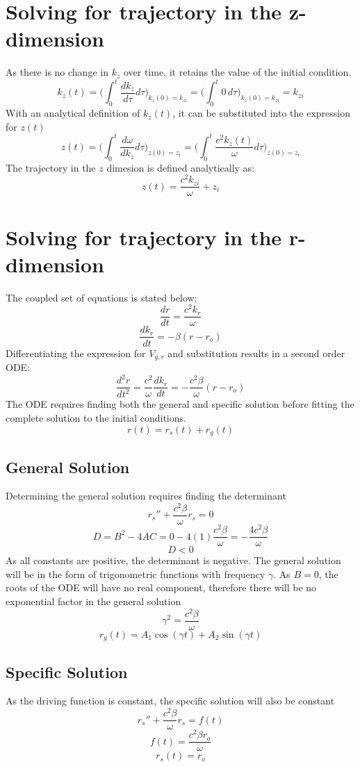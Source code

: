 \documentclass[11pt]{article}
\begin{document}
\section*{Solving for trajectory in the z-dimension}
As there is no change in $k_z$ over time, it retains the value of the initial condition.
$$k_z(t) = \bigg(\int_0^t{\frac{dk_z}{d\tau} d\tau}\bigg)_{k_z(0)=k_{zi}} = \bigg(\int_0^t{0\, d\tau}\bigg)_{k_z(0)=k_{zi}} = k_{zi} $$
With an analytical definition of $k_z(t)$, it can be substituted into the expression for $z(t)$
$$ z(t) = \bigg(\int_0^t{\frac{d\omega}{dk_z} d\tau}\bigg)_{z(0)=z_i} = \bigg(\int_0^t{\frac{c^2k_z(t)}{\omega} d\tau}\bigg)_{z(0)=z_i}$$
The trajectory in the $z$ dimesion is defined analytically as:
$$ z(t)= \frac{c^2k_{zi}}{\omega}+z_i$$

\section*{Solving for trajectory in the r-dimension}
The coupled set of equations is stated below:
$$\frac{dr}{dt} = \frac{c^2k_r}{\omega}$$
$$\frac{dk_r}{dt} = -\beta (r-r_o)$$
Differentiating the expression for $V_{g,r}$ and substitution results in a second order ODE:
$$\frac{d^2r}{dt^2} = \frac{c^2}{\omega}\frac{dk_r}{dt} = -\frac{c^2 \beta}{\omega}(r-r_o)$$
The ODE requires finding both the general and specific solution before fitting the complete solution to the initial conditions. 
$$r(t) = r_s(t) + r_g(t) $$
\subsection*{General Solution}
Determining the general solution requires finding the determinant
$$r_s'' + \frac{c^2 \beta}{\omega}r_s = 0$$
$$D = B^2 - 4AC = 0 - 4(1)\frac{c^2\beta}{\omega} = -\frac{4c^2\beta}{\omega}$$
$$D < 0 $$
As all constants are positive, the determinant is negative. The general solution will be in the form of trigonometric functions with frequency $\gamma$. As $B=0$, the roots of the ODE will have no real component, therefore there will be no exponential factor in the general solution
$$\gamma^2 = \frac{c^2\beta}{\omega}$$
$$r_g(t) = A_1\cos{(\gamma t)} + A_2 \sin{(\gamma t)}$$

\subsection*{Specific Solution}
As the driving function is constant, the specific solution will also be constant 
$$r_s'' + \frac{c^2 \beta}{\omega}r_s = f(t)$$
$$f(t) = \frac{c^2 \beta r_o}{\omega}$$
$$r_s(t) = r_o$$
\end{document}

